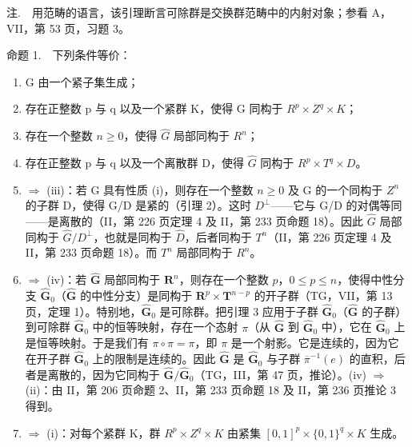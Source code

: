 注.　用范畴的语言，该引理断言可除群是交换群范畴中的内射对象；参看 A，VII，第 53 页，习题 3。

命题 1.　下列条件等价：

\begin{enumerate}
\def\labelenumi{(\roman{enumi})}
\item
  G 由一个紧子集生成；
\item
  存在正整数 p 与 q 以及一个紧群 K，使得 G 同构于 \(R^{p} \times Z^{q} \times K\)；
\item
  存在一个整数 \(n \geqslant 0\)，使得 \(\widehat{G}\) 局部同构于 \(R^{n}\)；
\item
  存在正整数 p 与 q 以及一个离散群 D，使得 \(\widehat{G}\) 同构于 \(R^{p} \times T^{q} \times D\)。
\item
  \(\Longrightarrow\) (iii)：若 G 具有性质 (i)，则存在一个整数 \(n \geqslant 0\) 及 G 的一个同构于 \(Z^{n}\) 的子群 D，使得 G/D 是紧的（引理 2）。这时 \(D^{\perp}\)——它与 G/D 的对偶等同——是离散的（II，第 226 页定理 4 及 II，第 233 页命题 18）。因此 \(\widehat{G}\) 局部同构于 \(\widehat{G}/D^{\perp}\)，也就是同构于 \(\widehat{D}\)，后者同构于 \(T^{n}\)（II，第 226 页定理 4 及 II，第 233 页命题 18）。而 \(T^{n}\) 局部同构于 \(R^{n}\)。
\item
  \(\Longrightarrow\) (iv)：若 \(\widehat{\mathbf{G}}\) 局部同构于 \(\mathbf{R}^n\)，则存在一个整数 \(p\)，\(0 \leqslant p \leqslant n\)，使得中性分支 \(\widehat{\mathbf{G}}_0\)（\(\widehat{\mathbf{G}}\) 的中性分支）是同构于 \(\mathbf{R}^p \times \mathbf{T}^{n-p}\) 的开子群（TG，VII，第 13 页，定理 1）。特别地，\(\widehat{\mathbf{G}}_0\) 是可除群。把引理 3 应用于子群 \(\widehat{\mathbf{G}}_0\)（\(\widehat{\mathbf{G}}\) 的子群）到可除群 \(\widehat{\mathbf{G}}_0\) 中的恒等映射，存在一个态射 \(\pi\)（从 \(\widehat{\mathbf{G}}\) 到 \(\widehat{\mathbf{G}}_0\) 中），它在 \(\widehat{\mathbf{G}}_0\) 上是恒等映射。于是我们有 \(\pi \circ \pi = \pi\)，即 \(\pi\) 是一个射影。它是连续的，因为它在开子群 \(\widehat{\mathbf{G}}_0\) 上的限制是连续的。因此 \(\widehat{\mathbf{G}}\) 是 \(\widehat{\mathbf{G}}_0\) 与子群 \(\overline{\pi}^{-1}(e)\) 的直积，后者是离散的，因为它同构于 \(\widehat{\mathbf{G}} / \widehat{\mathbf{G}}_0\)（TG，III，第 47 页，推论）。(iv) \(\Longrightarrow\) (ii)：由 II，第 206 页命题 2、II，第 233 页命题 18 及 II，第 236 页推论 3 得到。
\item
  \(\Longrightarrow\) (i)：对每个紧群 K，群 \(R^{p} \times Z^{q} \times K\) 由紧集 \([0,1]^{p} \times \{0,1\}^{q} \times K\) 生成。
\end{enumerate}

